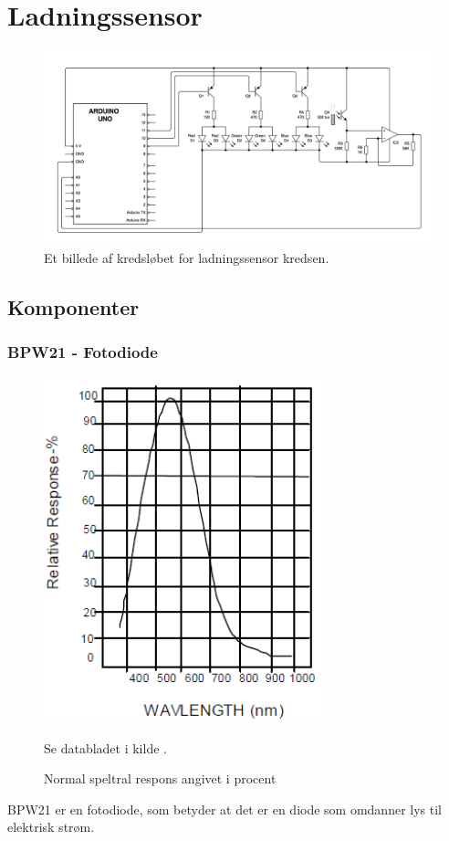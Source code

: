 \section{Ladningssensor}
\begin{figure}[H]
	\centering
    \includegraphics[width=\textwidth]{figures/CIRCUITS/farvesensorFinal.png}
	\caption{Et billede af kredsløbet for ladningssensor kredsen.}
\end{figure}

\subsection{Komponenter}
\subsubsection{BPW21 - Fotodiode}
\begin{figure}[H]
	\centering
    \includegraphics[height=10cm]{figures/komponenter/photosensor}
	\caption{Normal speltral respons angivet i procent}
	Se databladet i kilde \cite{kompPhoto}.
\end{figure}
BPW21 er en fotodiode, som betyder at det er en diode som omdanner lys til elektrisk strøm. 

